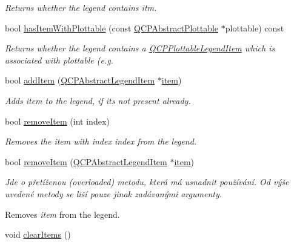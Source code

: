 \begin{DoxyCompactItemize}
\begin{DoxyCompactList}\small\item\em Returns whether the legend contains {\itshape itm}. \end{DoxyCompactList}\item 
bool \hyperlink{classQCPLegend_a2eb1d24bdf5658e64962a656303fd61a}{has\+Item\+With\+Plottable} (const \hyperlink{classQCPAbstractPlottable}{Q\+C\+P\+Abstract\+Plottable} $\ast$plottable) const 
\begin{DoxyCompactList}\small\item\em Returns whether the legend contains a \hyperlink{classQCPPlottableLegendItem}{Q\+C\+P\+Plottable\+Legend\+Item} which is associated with {\itshape plottable} (e.\+g. \end{DoxyCompactList}\item 
bool \hyperlink{classQCPLegend_a3ab274de52d2951faea45a6d975e6b3f}{add\+Item} (\hyperlink{classQCPAbstractLegendItem}{Q\+C\+P\+Abstract\+Legend\+Item} $\ast$\hyperlink{classQCPLegend_a454272d7094437beb3278a2294006da5}{item})
\begin{DoxyCompactList}\small\item\em Adds {\itshape item} to the legend, if it\textquotesingle{}s not present already. \end{DoxyCompactList}\item 
bool \hyperlink{classQCPLegend_ac91595c3eaa746fe6321d2eb952c63bb}{remove\+Item} (int index)
\begin{DoxyCompactList}\small\item\em Removes the item with index {\itshape index} from the legend. \end{DoxyCompactList}\item 
bool \hyperlink{classQCPLegend_a2aea4ec6da2d454dd0b241a254d65082}{remove\+Item} (\hyperlink{classQCPAbstractLegendItem}{Q\+C\+P\+Abstract\+Legend\+Item} $\ast$\hyperlink{classQCPLegend_a454272d7094437beb3278a2294006da5}{item})
\begin{DoxyCompactList}\small\item\em Jde o přetíženou (overloaded) metodu, která má usnadnit používání. Od výše uvedené metody se liší pouze jinak zadávanými argumenty.

Removes {\itshape item} from the legend. \end{DoxyCompactList}\item 
\hypertarget{classQCPLegend_a24795c7250eb5214fcea16b7217b4dfb}{}void \hyperlink{classQCPLegend_a24795c7250eb5214fcea16b7217b4dfb}{clear\+Items} ()\label{classQCPLegend_a24795c7250eb5214fcea16b7217b4dfb}


\end{DoxyCompactItemize}
